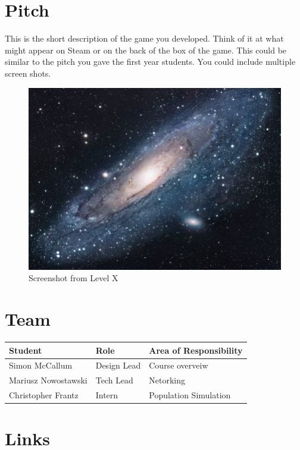 
\section{Pitch}
\label{sec:pitch}
This is the short description of the game you developed.  Think of it at what might appear on Steam or on the back of the box of the game.  This could be similar to the pitch you gave the first year students. You could include multiple screen shots.

\begin{figure}[h!]
\centering
\includegraphics[scale=1.7]{images/universe.jpg}
\caption{Screenshot from Level X }
\label{fig:univerise}
\end{figure}


\section{Team}
\label{sec:team}

\begin{tabular}{lll}
Student         & Role          & Area of Responsibility \\ \hline
Simon McCallum  & Design Lead   & Course overveiw\\
Mariusz Nowostawski & Tech Lead & Netorking \\
Christopher Frantz & Intern     & Population Simulation\\
\end{tabular}

\section{Links}



